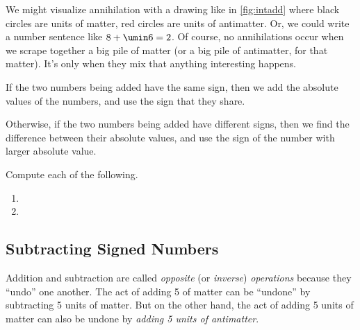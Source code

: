 We might visualize annihilation with a drawing like in \cref{fig:intadd} where black circles are units of matter, red circles are units of antimatter. Or, we could write a number sentence like $8 + \umin6 = 2$. Of course, no annihilations occur when we scrape together a big pile of matter (or a big pile of antimatter, for that matter). It's only when they mix that anything interesting happens.

\begin{boxeddef}
If the two numbers being added have the same sign, then we add the absolute values of the numbers, and use the sign that they share.

Otherwise, if the two numbers being added have different signs, then we find the difference between their absolute values, and use the sign of the number with larger absolute value.
\end{boxeddef}

\begin{boxedex}
Compute each of the following.

\begin{enumerate}[itemsep=10pt]

\item {}

\item {}

\end{enumerate}
\end{boxedex}

\subsection{Subtracting Signed Numbers}

Addition and subtraction are called \textit{opposite} (or \textit{inverse}) \textit{operations} because they ``undo'' one another. The act of adding 5 of matter can be ``undone'' by subtracting 5 units of matter. But on the other hand, the act of adding 5 units of matter can also be undone by \textit{adding 5 units of antimatter}.


